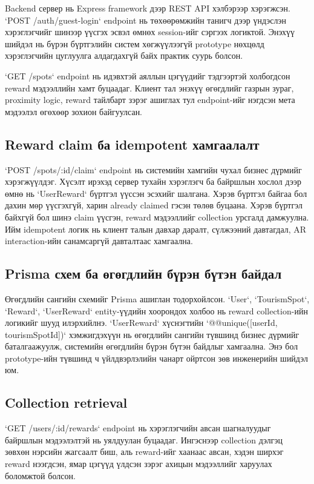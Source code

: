 \begin{sloppy}
Backend сервер нь Express framework дээр REST API хэлбэрээр хэрэгжсэн. `POST /auth/guest-login` endpoint нь төхөөрөмжийн танигч дээр үндэслэн хэрэглэгчийг шинээр үүсгэх эсвэл өмнөх session-ийг сэргээх логиктой. Энэхүү шийдэл нь бүрэн бүртгэлийн систем хөгжүүлээгүй prototype нөхцөлд хэрэглэгчийн цуглуулга алдагдахгүй байх практик суурь болсон.

`GET /spots` endpoint нь идэвхтэй аяллын цэгүүдийг тэдгээртэй холбогдсон reward мэдээллийн хамт буцаадаг. Клиент тал энэхүү өгөгдлийг газрын зураг, proximity logic, reward тайлбарт зэрэг ашиглах тул endpoint-ийг нэгдсэн мета мэдээлэл өгөхөөр зохион байгуулсан.

\subsection{Reward claim ба idempotent хамгаалалт}

`POST /spots/:id/claim` endpoint нь системийн хамгийн чухал бизнес дүрмийг хэрэгжүүлдэг. Хүсэлт ирэхэд сервер тухайн хэрэглэгч ба байршлын хослол дээр өмнө нь `UserReward` бүртгэл үүссэн эсэхийг шалгана. Хэрэв бүртгэл байгаа бол дахин мөр үүсгэхгүй, харин already claimed гэсэн төлөв буцаана. Хэрэв бүртгэл байхгүй бол шинэ claim үүсгэн, reward мэдээллийг collection урсгалд дамжуулна. Ийм idempotent логик нь клиент талын давхар даралт, сүлжээний давтагдал, AR interaction-ийн санамсаргүй давталтаас хамгаална.

\subsection{Prisma схем ба өгөгдлийн бүрэн бүтэн байдал}

Өгөгдлийн сангийн схемийг Prisma ашиглан тодорхойлсон. `User`, `TourismSpot`, `Reward`, `UserReward` entity-үүдийн хоорондох холбоо нь reward collection-ийн логикийг шууд илэрхийлнэ. `UserReward` хүснэгтийн `@@unique([userId, tourismSpotId])` хэмжигдэхүүн нь өгөгдлийн сангийн түвшинд бизнес дүрмийг баталгаажуулж, системийн өгөгдлийн бүрэн бүтэн байдлыг хамгаална. Энэ бол prototype-ийн түвшинд ч үйлдвэрлэлийн чанарт ойртсон зөв инженерийн шийдэл юм.

\subsection{Collection retrieval}

`GET /users/:id/rewards` endpoint нь хэрэглэгчийн авсан шагналуудыг байршлын мэдээлэлтэй нь уялдуулан буцаадаг. Ингэснээр collection дэлгэц зөвхөн нэрсийн жагсаалт биш, аль reward-ийг хаанаас авсан, хэдэн ширхэг reward нээгдсэн, ямар цэгүүд үлдсэн зэрэг ахицын мэдээллийг харуулах боломжтой болсон.


\end{sloppy}
